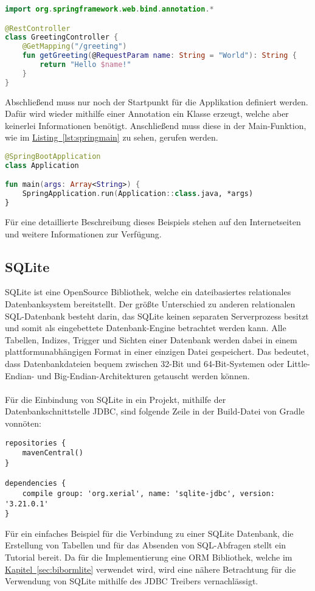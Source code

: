 \begin{lstlisting}[style=lstStyleFramed, language=Kotlin, caption={Beispiel: Spring Controller}, label=lst:springcontroller, float]
import org.springframework.web.bind.annotation.*

@RestController
class GreetingController {
	@GetMapping("/greeting")
	fun getGreeting(@RequestParam name: String = "World"): String {
		return "Hello $name!"
	}
}
\end{lstlisting}
Abschließend muss nur noch der Startpunkt für die Applikation definiert werden. Dafür wird wieder mithilfe einer Annotation ein Klasse erzeugt, welche aber keinerlei Informationen benötigt. Anschließend muss diese in der Main-Funktion, wie im \hyperref[lst:springmain]{Listing~\ref{lst:springmain}} zu sehen, gerufen werden. 
\begin{lstlisting}[style=lstStyleFramed, language=Kotlin, caption={Beispiel: Spring Application Class}, label=lst:springmain, float]
@SpringBootApplication
class Application

fun main(args: Array<String>) {
	SpringApplication.run(Application::class.java, *args)
}
\end{lstlisting}
Für eine detaillierte Beschreibung dieses Beispiels stehen auf den Internetseiten \cite{springTutorialKotlin} und \cite{springTutorial} weitere Informationen zur Verfügung.

\subsection{SQLite}\label{sec:bibsqlite}
SQLite ist eine OpenSource Bibliothek, welche ein dateibasiertes relationales Datenbanksystem bereitstellt. Der größte Unterschied zu anderen relationalen SQL-Datenbank besteht darin, das SQLite keinen separaten Serverprozess besitzt und somit als eingebettete Datenbank-Engine betrachtet werden kann. Alle Tabellen, Indizes, Trigger und Sichten einer Datenbank werden dabei in einem plattformunabhängigen Format in einer einzigen Datei gespeichert. Das bedeutet, dass Datenbankdateien bequem zwischen 32-Bit und 64-Bit-Systemen oder Little-Endian- und Big-Endian-Architekturen getauscht werden können.\cite{sqliteAbout}\\
\\
Für die Einbindung von SQLite in ein Projekt, mithilfe der Datenbankschnittstelle \gls{JDBC}, sind folgende Zeile in der Build-Datei von Gradle vonnöten:
\begin{lstlisting}[style=lstStyleFramed, language=Gradle, caption={Einbindung der Bibliothek SQLite mithilfe von Gradle}, label=lst:sqlite, float]
repositories {
	mavenCentral()
}

dependencies {
	compile group: 'org.xerial', name: 'sqlite-jdbc', version: '3.21.0.1'
}
\end{lstlisting}
Für ein einfaches Beispiel für die Verbindung zu einer SQLite Datenbank, die Erstellung von Tabellen und für das Absenden von SQL-Abfragen stellt \cite{sqliteJDBCTutorial} ein Tutorial bereit. Da für die Implementierung eine \gls{ORM} Bibliothek, welche im \hyperref[sec:bibormlite]{Kapitel~\ref{sec:bibormlite}} verwendet wird, wird eine nähere Betrachtung für die Verwendung von SQLite mithilfe des \gls{JDBC} Treibers vernachlässigt.

